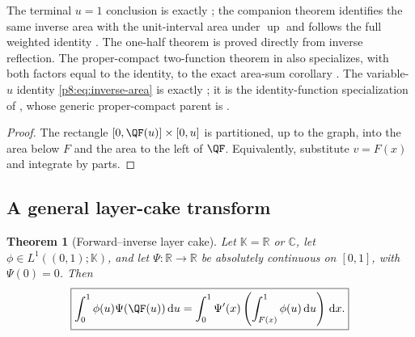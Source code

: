 \documentclass[11pt,oneside]{article}
\newtheorem{theorem}{Theorem}[section]
\theoremstyle{definition}
\theoremstyle{remark}
\newcommand{\Up}{\operatorname{up}}
\newcommand{\R}{\mathbb R}
\newcommand{\C}{\mathbb C}
\newcommand{\dd}{\,\mathrm d}
\newcommand{\1}{\mathbf 1}
\begin{document}
The terminal \(u=1\) conclusion is exactly
; the companion theorem
 identifies the same
inverse area with the unit-interval area under \(\Up\) and follows the full weighted
identity .  The one-half theorem is proved
directly from inverse reflection.  The proper-compact two-function theorem
 in
 also specializes, with both factors equal to the identity,
to the exact area-sum corollary
.
The variable-\(u\) identity \eqref{p8:eq:inverse-area} is exactly
; it is
the identity-function specialization of
, whose
generic proper-compact parent is
.

\begin{proof}
The rectangle \([0,\QF(u)]\times[0,u]\) is partitioned, up to the graph, into
the area below \(F\) and the area to the left of \(\QF\).  Equivalently,
substitute \(v=F(x)\) and integrate by parts.
\end{proof}

\subsection{A general layer-cake transform}

\begin{theorem}[Forward--inverse layer cake]
\label{p8:thm:inverse-layercake}
Let \(\mathbb K=\R\) or \(\C\), let \(\phi\in L^1((0,1);\mathbb K)\), and let
\(\Psi:\R\to\R\) be absolutely continuous on \([0,1]\), with \(\Psi(0)=0\).  Then
\begin{equation}
 \boxed{
 \int_0^1\phi(u)\Psi(\QF(u))\dd u
 =\int_0^1\Psi'(x)\left(\int_{F(x)}^1\phi(u)\dd u\right)\dd x.}
 \label{p8:eq:inverse-layercake}
\end{equation}
\statusprovedPartll
\end{theorem}
\end{document}
